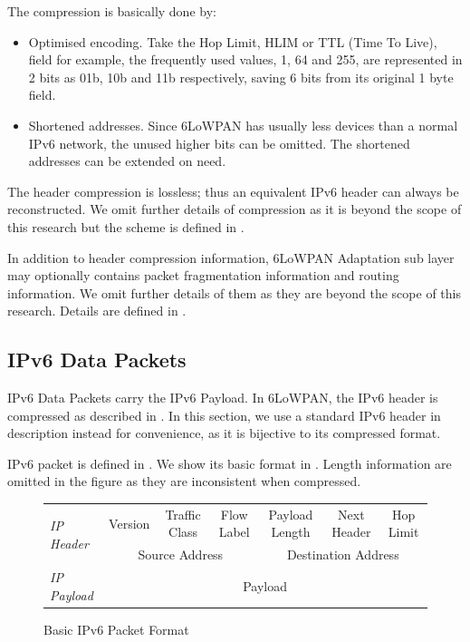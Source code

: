The compression is basically done by:
\begin{itemize}
	\item Optimised encoding. Take the Hop Limit, HLIM or TTL (Time To Live), field for example, the frequently used values, 1, 64 and 255, are represented in 2 bits as 01b, 10b and 11b respectively, saving 6 bits from its original 1 byte field.
	\item Shortened addresses. Since 6LoWPAN has usually less devices than a normal IPv6 network, the unused higher bits can be omitted. The shortened addresses can be extended on need.
\end{itemize}

The header compression is lossless; thus an equivalent IPv6 header can always be reconstructed. We omit further details of compression as it is beyond the scope of this research but the scheme is defined in \cite{rfc6282}.

In addition to header compression information, 6LoWPAN Adaptation sub layer may optionally contains packet fragmentation information and routing information. We omit further details of them as they are beyond the scope of this research. Details are defined in \cite{rfc4944}.

\subsection{IPv6 Data Packets} \label{Subsec: IPv6 Data Packets}

IPv6 Data Packets carry the IPv6 Payload. In 6LoWPAN, the IPv6 header is compressed as described in . In this section, we use a standard IPv6 header in description instead for convenience, as it is bijective to its compressed format.

IPv6 packet is defined in \cite{rfc2460}. We show its basic format in . Length information are omitted in the figure as they are inconsistent when compressed.

\begin{figure}[h!]
\center
	\begin{tabular}{l|c|c|c|c|c|c|}
	\cline{2-7}
	\multirow{2}{*}{\textit{IP Header}} & Version & Traffic Class & Flow Label & Payload Length & Next Header & Hop Limit \\ \cline{2-7} 
	                                & \multicolumn{3}{c|}{Source Address}  & \multicolumn{3}{c|}{Destination Address} \\ \cline{2-7} 
	\textit{IP Payload}                 & \multicolumn{6}{c|}{Payload}                                                    \\ \cline{2-7} 
	\end{tabular}
	\caption{Basic IPv6 Packet Format} \label{Fig: Basic IPv6 Packet Format}
\end{figure}


